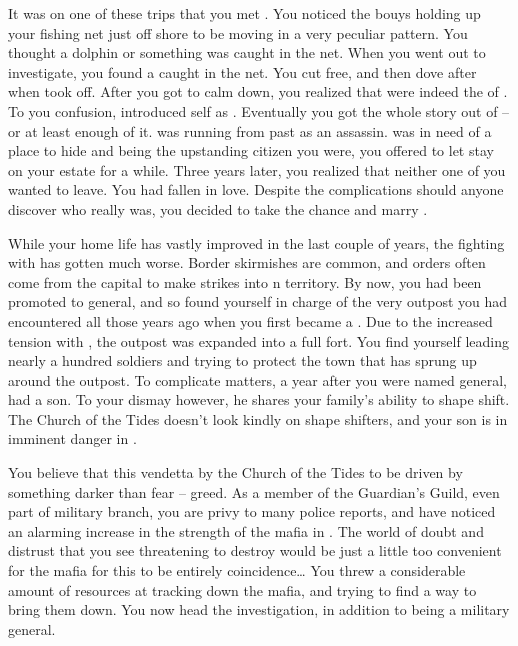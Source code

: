 \documentclass[char]{NeptuneBall}
\begin{document}
It was on one of these trips that you met \cQueen{}. You noticed the bouys holding up your fishing net just off shore to be moving in a very peculiar pattern. You thought a dolphin or something was caught in the net. When you went out to investigate, you found a \cQueen{\mer} caught in the net. You cut \cQueen{\them} free, and then dove after \cQueen{\them} when \cQueen{\they} took off. After you got \cQueen{} to calm down, you realized that \cQueen{\they} were indeed the \cQueen{\King} of \pAtlantis{}. To you confusion, \cQueen{\they} introduced \cQueen{\them}self as \cQueen{\MYname}. Eventually you got the whole story out of \cQueen{\them} -- or at least enough of it. \cQueen{} was running from \cQueen{\them} past as an assassin. \cQueen{} was in need of a place to hide and being the upstanding citizen you were, you offered to let \cQueen{\them} stay on your estate for a while.  Three years later, you realized that neither one of you wanted \cQueen{\them} to leave. You had fallen in love. Despite the complications should anyone discover who \cQueen{} really was, you decided to take the chance and marry \cQueen{\them}.

While your home life has vastly improved in the last couple of years, the fighting with \pPacifica{} has gotten much worse. Border skirmishes are common, and orders often come from the capital to make strikes into \pPacifica{}n territory. By now, you had been promoted to general, and so found yourself in charge of the very outpost you had encountered all those years ago when you first became a \cGeneral{\mer}. Due to the increased tension with \pPacifica{}, the outpost was expanded into a full fort. You find yourself leading nearly a hundred soldiers and trying to protect the town that has sprung up around the outpost. To complicate matters, a year after you were named general, \cQueen{} had a son. To your dismay however, he shares your family's ability to shape shift. The Church of the Tides doesn't look kindly on shape shifters, and your son is in imminent danger in \pAtlantis{}.

You believe that this vendetta by the Church of the Tides to be driven by something darker than fear -- greed. As a member of the Guardian's Guild, even part of military branch, you are privy to many police reports, and have noticed an alarming increase in the strength of the mafia in \pAtlantis{}. The world of doubt and distrust that you see threatening to destroy \pAtlantis{} would be just a little too convenient for the mafia for this to be entirely coincidence\ldots{} You threw a considerable amount of resources at tracking down the mafia, and trying to find a way to bring them down. You now head the investigation, in addition to being a military general.
\end{document}
